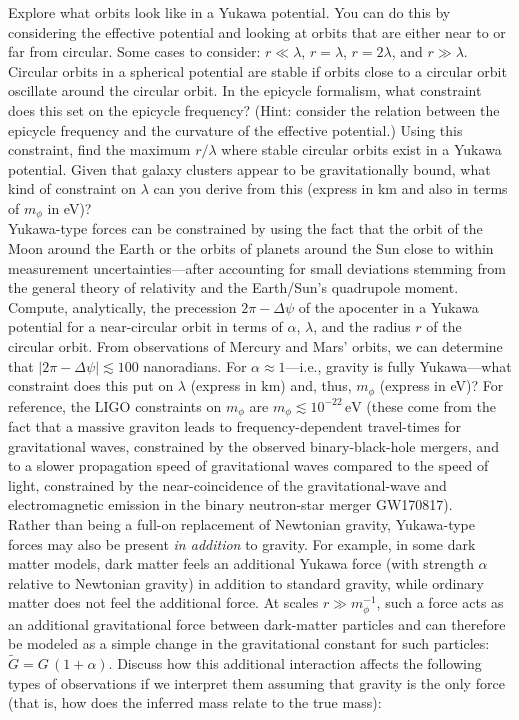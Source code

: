 \documentclass[12pt]{article}
\begin{document}
 Explore what orbits look like in a Yukawa
potential. You can do this by considering the effective potential and
looking at orbits that are either near to or far from circular. Some
cases to consider: $r \ll \lambda$, $r = \lambda$, $r = 2\lambda$, and
$r \gg \lambda$.\\

 Circular orbits in a spherical potential are
stable if orbits close to a circular orbit oscillate around the
circular orbit. In the epicycle formalism, what constraint does this
set on the epicycle frequency? (Hint: consider the relation between the
epicycle frequency and the curvature of the effective
potential.) Using this constraint, find the maximum $r/\lambda$ where
stable circular orbits exist in a Yukawa potential. Given that galaxy
clusters appear to be gravitationally bound, what kind of constraint
on $\lambda$ can you derive from this (express in km and also in terms
of $m_\phi$ in eV)?\\

 Yukawa-type forces can be constrained by using
the fact that the orbit of the Moon around the Earth or the orbits of
planets around the Sun close to within measurement
uncertainties---after accounting for small deviations stemming from
the general theory of relativity and the Earth/Sun's quadrupole
moment. Compute, analytically, the precession $2\pi-\Delta \psi$ of
the apocenter in a Yukawa potential for a near-circular orbit in terms
of $\alpha$, $\lambda$, and the radius $r$ of the circular orbit. From
observations of Mercury and Mars' orbits, we can determine that
$|2\pi-\Delta \psi| \lesssim 100$ nanoradians. For $\alpha \approx
1$---i.e., gravity is fully Yukawa---what constraint does this put on
$\lambda$ (express in km) and, thus, $m_\phi$ (express in eV)? For
reference, the LIGO constraints on $m_\phi$ are $m_\phi \lesssim
10^{-22}\,\mathrm{eV}$ (these come from the fact that a massive
graviton leads to frequency-dependent travel-times for gravitational
waves, constrained by the observed binary-black-hole mergers, and to a
slower propagation speed of gravitational waves compared to the speed
of light, constrained by the near-coincidence of the
gravitational-wave and electromagnetic emission in the binary
neutron-star merger GW170817).\\

 Rather than being a full-on replacement of
Newtonian gravity, Yukawa-type forces may also be present \emph{in
  addition} to gravity. For example, in some dark matter models, dark
matter feels an additional Yukawa force (with strength $\alpha$
relative to Newtonian gravity) in addition to standard gravity, while
ordinary matter does not feel the additional force.  At scales $r \gg
m_\phi^{-1}$, such a force acts as an additional gravitational force
between dark-matter particles and can therefore be modeled as a simple
change in the gravitational constant for such particles: $\tilde{G} =
G\,(1+\alpha)$. Discuss how this additional interaction affects the
following types of observations if we interpret them assuming that
gravity is the only force (that is, how does the inferred mass relate
to the true mass):
\end{document}
